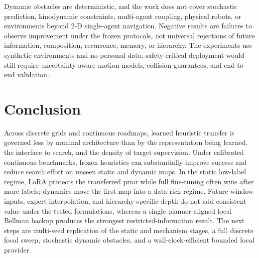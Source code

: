 \documentclass[letterpaper]{article} %
\begin{document}
Dynamic obstacles are deterministic, and the work does not cover stochastic prediction, kinodynamic constraints, multi-agent coupling, physical robots, or environments beyond 2-D single-agent navigation. Negative results are failures to observe improvement under the frozen protocols, not universal rejections of future information, composition, recurrence, memory, or hierarchy. The experiments use synthetic environments and no personal data; safety-critical deployment would still require uncertainty-aware motion models, collision guarantees, and end-to-end validation.

\section{Conclusion}

Across discrete grids and continuous roadmaps, learned heuristic transfer is governed less by nominal architecture than by the representation being learned, the interface to search, and the density of target supervision. Under calibrated continuous benchmarks, frozen heuristics can substantially improve success and reduce search effort on unseen static and dynamic maps. In the static low-label regime, LoRA protects the transferred prior while full fine-tuning often wins after more labels; dynamics move the first map into a data-rich regime. Future-window inputs, expert interpolation, and hierarchy-specific depth do not add consistent value under the tested formulations, whereas a single planner-aligned local Bellman backup produces the strongest restricted-information result. The next steps are multi-seed replication of the static and mechanism stages, a full discrete focal sweep, stochastic dynamic obstacles, and a wall-clock-efficient bounded local provider.



\end{document}
